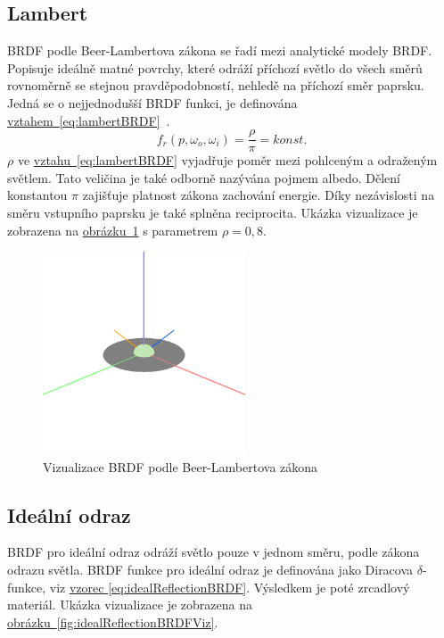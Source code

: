 \documentclass[czech,master]{diploma}
\newcommand{\point}{p}
\newcommand{\brdf}{f_r\left(\point,\omega_{o},\omega_{i}\right)}
\newcommand{\alb}{\rho}
\begin{document}
\subsection{Lambert} \label{sec:Lambert}
BRDF podle Beer-Lambertova zákona se řadí mezi analytické modely BRDF\@. Popisuje ideálně matné povrchy, které odráží příchozí světlo do všech směrů rovnoměrně se stejnou pravděpodobností, nehledě na příchozí směr paprsku. Jedná se o nejjednodušší BRDF funkci, je definována \hyperref[eq:lambertBRDF]{vztahem~\ref{eq:lambertBRDF}}~\cite{Koppal2014}.
\begin{equation} \label{eq:lambertBRDF}
  \brdf = \frac{\alb}{\pi} = konst.
\end{equation}
\(\alb\) ve \hyperref[eq:lambertBRDF]{vztahu~\ref{eq:lambertBRDF}} vyjadřuje poměr mezi pohlceným a odraženým světlem. Tato veličina je také odborně nazývána pojmem albedo. Dělení konstantou \(\pi\) zajišťuje platnost zákona zachování energie. Díky nezávislosti na směru vstupního paprsku je také splněna reciprocita. Ukázka vizualizace je zobrazena na \hyperref[fig:lambertBRDFRender]{obrázku~\ref{fig:lambertBRDFRender}} s parametrem \(\alb = 0{,}8\).

\begin{figure}[ht]%
  \centering
  \includegraphics[width=6cm]{Figures/visualizations/brdfLambert.png}%
  \caption{Vizualizace BRDF podle Beer-Lambertova zákona}%
  \label{fig:lambertBRDFRender}%
\end{figure}

\subsection{Ideální odraz} \label{sec:idealReflection}
BRDF pro ideální odraz odráží světlo pouze v jednom směru, podle zákona odrazu světla. BRDF funkce pro ideální odraz je definována jako Diracova \(\delta\)-funkce, viz \hyperref[eq:idealReflectionBRDF]{vzorec \ref{eq:idealReflectionBRDF}}. Výsledkem je poté zrcadlový materiál. Ukázka vizualizace je zobrazena na \hyperref[fig:idealReflectionBRDFViz]{obrázku~\ref{fig:idealReflectionBRDFViz}}.
\end{document}
